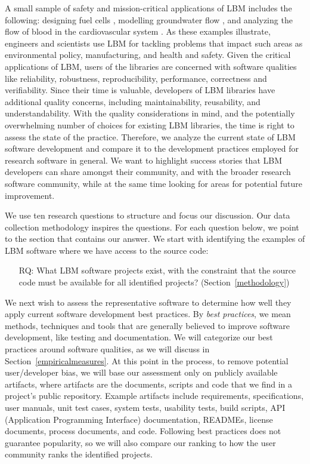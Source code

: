 \documentclass[final, 3p, times, authoryear]{elsarticle}
\newcounter{rqnum} %
\begin{document}
A small sample of safety and mission-critical applications of LBM includes the
following: designing fuel cells \citep{ZhangEtAl2018}, modelling groundwater
flow \citep{AnwarAndSukop2009}, and analyzing the flow of blood in the
cardiovascular system \citep{SadeghiEtAl2022b, SadeghiEtAl2022,
SadeghiEtAl2020}.  As these examples illustrate, engineers and scientists use
LBM for tackling problems that impact such areas as environmental policy,
manufacturing, and health and safety. Given the critical applications of LBM,
users of the libraries are concerned with software qualities like reliability,
robustness, reproducibility, performance, correctness and verifiability.  Since
their time is valuable, developers of LBM libraries have additional quality
concerns, including maintainability, reusability, and understandability.  With
the quality considerations in mind, and the potentially overwhelming number of
choices for existing LBM libraries, the time is right to assess the state of the
practice. Therefore, we analyze the current state of LBM
software development and compare it to the development practices employed for
research software in general.  We want to highlight success stories that LBM
developers can share amongst their community, and with the broader research
software community, while at the same time looking for areas for potential
future improvement.

We use ten research questions to structure and focus our discussion. Our data
collection methodology \citep{SmithEtAl2021, SmithAndMichalski2022} inspires the
questions.  For each question below, we point to the section that contains our
answer.  We start with identifying the examples of LBM software where we have
access to the source code:

\begin{enumerate}
	\item[RQ\refstepcounter{rqnum}\therqnum \label{RQ_WhatProjects}:] What LBM
	software projects exist, with the constraint that the source code must be
	available for all identified projects? (Section~\ref{methodology})
\end{enumerate}

We next wish to assess the representative software to determine how well they
apply current software development best practices.  By \emph{best practices}, we
mean methods, techniques and tools that are generally believed to improve
software development, like testing and documentation.  We will categorize our
best practices around software qualities, as we will discuss in
Section~\ref{empiricalmeasures}.  At this point in the process, to remove
potential user/developer bias, we will base our assessment only on publicly
available artifacts, where artifacts are the documents, scripts and code that we
find in a project's public repository. Example artifacts include requirements,
specifications, user manuals, unit test cases, system tests, usability tests,
build scripts, API (Application Programming Interface) documentation, READMEs,
license documents, process documents, and code. Following best practices does
not guarantee popularity, so we will also compare our ranking to how the user
community ranks the identified projects.
\end{document}
